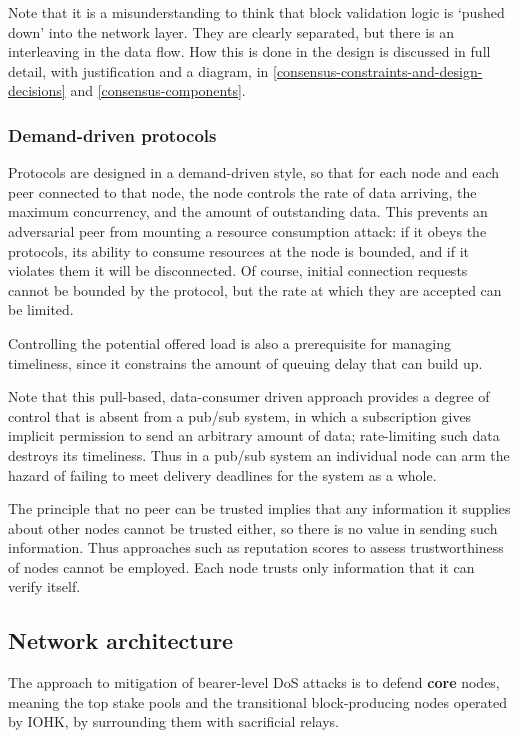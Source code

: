 \documentclass[11pt,a4paper]{article}
\begin{document}
Note that it is a misunderstanding to think that block validation logic
is `pushed down' into the network layer. They are clearly separated, but
there is an interleaving in the data flow. How this is done in the
design is discussed in full detail, with justification and a diagram, in
\cref{consensus-constraints-and-design-decisions} and \cref{consensus-components}.

\subsubsection{Demand-driven protocols}
\label{demand-driven-protocols}

Protocols are designed in a demand-driven style, so that for each node
and each peer connected to that node, the node controls the rate of data
arriving, the maximum concurrency, and the amount of outstanding data.
This prevents an adversarial peer from mounting a resource consumption
attack: if it obeys the protocols, its ability to consume resources at
the node is bounded, and if it violates them it will be disconnected. Of
course, initial connection requests cannot be bounded by the protocol,
but the rate at which they are accepted can be limited.

Controlling the potential offered load is also a prerequisite for
managing timeliness, since it constrains the amount of queuing delay
that can build up.

Note that this pull-based, data-consumer driven approach provides a
degree of control that is absent from a pub/sub system, in which a
subscription gives implicit permission to send an arbitrary amount of
data; rate-limiting such data destroys its timeliness. Thus in a pub/sub
system an individual node can arm the hazard of failing to meet delivery
deadlines for the system as a whole.

The principle that no peer can be trusted implies that any information
it supplies about other nodes cannot be trusted either, so there is no
value in sending such information. Thus approaches such as reputation
scores to assess trustworthiness of nodes cannot be employed. Each node
trusts only information that it can verify itself.

\subsection{Network architecture}
\label{network-architecture}

The approach to mitigation of bearer-level DoS attacks is to defend
\textbf{core} nodes, meaning the top stake pools and the transitional
block-producing nodes operated by IOHK, by surrounding them with
sacrificial relays.
\end{document}
